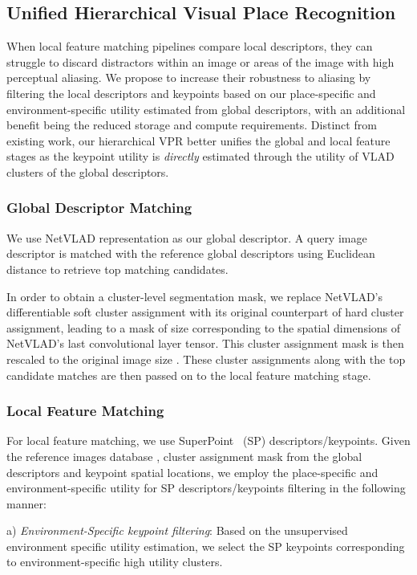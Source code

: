 \documentclass[letterpaper, 10 pt, conference]{ieeeconf}  \fi
\begin{document}
\subsection{Unified Hierarchical Visual Place Recognition}
\label{sec:HierApp}

When local feature matching pipelines compare local descriptors, they can struggle to discard distractors within an image or areas of the image with high perceptual aliasing. We propose to increase their robustness to aliasing by filtering the local descriptors and keypoints based on our place-specific and environment-specific utility estimated from global descriptors, with an additional benefit being the reduced storage and compute requirements. Distinct from existing work, our hierarchical VPR better unifies the global and local feature stages as the keypoint utility is \textit{directly} estimated through the utility of VLAD clusters of the global descriptors.

\subsubsection{Global Descriptor Matching}
\label{sec:GDM}
We use NetVLAD representation as our global descriptor. A query image descriptor is matched with the reference global descriptors using Euclidean distance to retrieve top  matching candidates.

In order to obtain a cluster-level segmentation mask, we replace NetVLAD's differentiable soft cluster assignment with its original counterpart of hard cluster assignment, leading to a mask of size  corresponding to the spatial dimensions of NetVLAD's last convolutional layer tensor. This cluster assignment mask is then rescaled to the original image size . These cluster assignments along with the top  candidate matches are then passed on to the local feature matching stage.

\subsubsection{Local Feature Matching}
\label{sec:LFM}
For local feature matching, we use SuperPoint~\cite{detone2018superpoint} (SP) descriptors/keypoints. Given the reference images database , cluster assignment mask from the global descriptors and keypoint spatial locations, we employ the place-specific and environment-specific utility for SP descriptors/keypoints filtering in the following manner:

a) \textit{Environment-Specific keypoint filtering}: Based on the unsupervised environment specific utility estimation, we select the SP keypoints corresponding to environment-specific high utility clusters.
\end{document}
